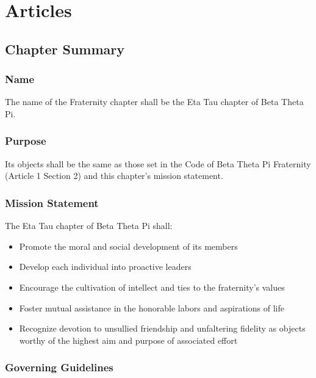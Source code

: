 \part{Articles}

\chapter{Chapter Summary}
\label{cha:chapter-summary}

\section{Name}
\label{sec:name}

The name of the Fraternity chapter shall be the Eta Tau chapter of Beta Theta
Pi.

\section{Purpose}
\label{sec:purpose}

Its objects shall be the same as those set in the Code of Beta Theta Pi
Fraternity (Article 1 Section 2) and this chapter's mission statement.

\section{Mission Statement}
\label{sec:mission-statement}

The Eta Tau chapter of Beta Theta Pi shall:
\begin{itemize}
	\item Promote the moral and social development of its members
	\item Develop each individual into proactive leaders
	\item Encourage the cultivation of intellect and ties to the fraternity's
		values
	\item Foster mutual assistance in the honorable labors and aspirations of
		life
	\item Recognize devotion to unsullied friendship and unfaltering fidelity as
		objects worthy of the highest aim and purpose of associated effort
\end{itemize}

\section{Governing Guidelines}
\label{sec:governing-guidelines}


